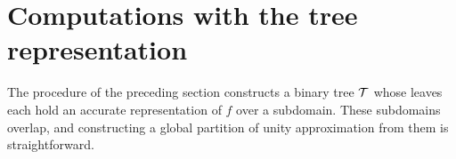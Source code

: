 



\section{Computations with the tree representation}
\label{sec:operations}

The procedure of the preceding section constructs a binary tree $\mathcal{T}$ whose leaves each hold an accurate representation of $f$ over a subdomain. These subdomains overlap, and constructing a global partition of unity approximation from them is straightforward.

